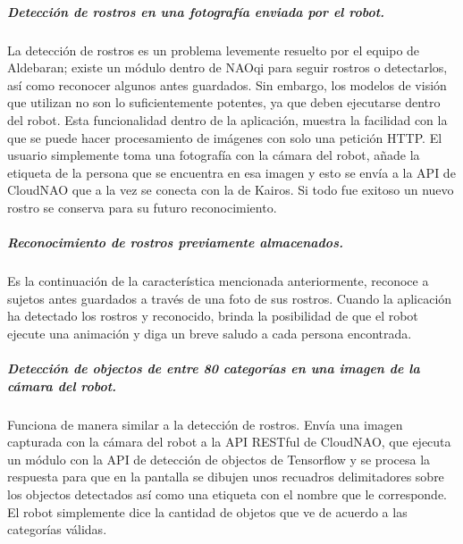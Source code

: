 \subparagraph{Detección de rostros en una fotografía enviada por el robot.}
\label{\detokenize{users_docs:deteccion-de-rostros-en-una-fotografia-enviada-por-el-robot}}
La detección  de rostros es un problema levemente resuelto por el equipo
de Aldebaran; existe un módulo dentro de NAOqi para seguir rostros o detectarlos,
así como reconocer algunos antes guardados. Sin embargo, los modelos de visión
que utilizan no son lo suficientemente potentes, ya que deben ejecutarse dentro
del robot. Esta funcionalidad dentro de la aplicación, muestra la facilidad con
la que se puede hacer procesamiento de imágenes con solo una petición HTTP.
El usuario simplemente toma una fotografía con la cámara del robot, añade
la etiqueta de la persona que se encuentra en esa imagen y esto se envía
a la API de CloudNAO que a la vez se conecta con la de Kairos. Si todo fue
exitoso un nuevo rostro se conserva para su futuro reconocimiento.


\subparagraph{Reconocimiento de rostros previamente almacenados.}
\label{\detokenize{users_docs:reconocimiento-de-rostros-previamente-almacenados}}
Es la continuación de la característica mencionada anteriormente, reconoce
a sujetos antes guardados a través de una foto de sus rostros. Cuando
la aplicación ha detectado los rostros y reconocido, brinda la posibilidad
de que el robot ejecute una animación y diga un breve saludo a cada persona
encontrada.


\begin{figure}[!h]
    \centering

\end{figure}


\subparagraph{Detección de objectos de entre 80 categorías en una imagen de la cámara del robot.}
\label{\detokenize{users_docs:deteccion-de-objectos-de-entre-80-categorias-en-una-imagen-de-la-camara-del-robot}}
Funciona de manera similar a la detección de rostros. Envía una imagen capturada
con la cámara del robot a la API RESTful de CloudNAO, que ejecuta un módulo
con la API de detección de objectos de Tensorflow y se procesa la respuesta para
que en la pantalla se dibujen unos
recuadros delimitadores sobre los objectos detectados así como una etiqueta
con el nombre que le corresponde. El robot simplemente
dice la cantidad de objetos que ve de acuerdo a las categorías válidas.

\begin{figure}[!h]
    \centering
    \qquad

\end{figure}


